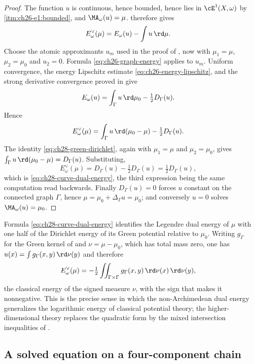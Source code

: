 \begin{proof}
The function $u$ is continuous, hence bounded, hence lies in
$\cE^1(X,\omega)$ by
\,\cref{itm:ch26-e1:bounded}, and
$\MA_\omega(u)=\mu$.   therefore gives
\[
 E^\vee_\omega(\mu)=E_\omega(u)-\int u\,\rd\mu .
\]
Choose the atomic approximants $u_m$ used in the proof of
, now with $\mu_1=\mu$,
$\mu_2=\mu_0$ and $u_2=0$.  Formula \eqref{eq:ch26-graph-energy} applies
to $u_m$.  Uniform convergence, the energy Lipschitz estimate
\eqref{eq:ch26-energy-lipschitz}, and the strong derivative convergence proved in
 give
\[
 E_\omega(u)=\int_\Gamma u\,\rd\mu_0-\tfrac12 D_\Gamma(u).
\]
Hence
\[
 E^\vee_\omega(\mu)
 =\int_\Gamma u\,\rd(\mu_0-\mu)-\tfrac12D_\Gamma(u).
\]
The identity \eqref{eq:ch28-green-dirichlet}, again with
$\mu_1=\mu$ and $\mu_2=\mu_0$, gives
$\int_\Gamma u\,\rd(\mu_0-\mu)=D_\Gamma(u)$.  Substituting,
\[
 E^\vee_\omega(\mu)=D_\Gamma(u)-\tfrac12D_\Gamma(u)
 =\tfrac12D_\Gamma(u),
\]
which is \eqref{eq:ch28-curve-dual-energy}, the third expression being the
same computation read backwards.  Finally $D_\Gamma(u)=0$ forces $u$
constant on the connected graph $\Gamma$, hence
$\mu=\mu_0+\Delta_\Gamma u=\mu_0$; and conversely $u=0$ solves
$\MA_\omega(u)=\mu_0$.
\end{proof}

\begin{remark}
\label{rem:ch28-classical-energy}
Formula \eqref{eq:ch28-curve-dual-energy} identifies the Legendre dual
energy of $\mu$ with one half of the Dirichlet energy of its Green
potential relative to $\mu_0$.  Writing $g_\Gamma$ for the Green kernel
of  and $\nu=\mu-\mu_0$, which has total mass
zero, one has $u(x)=\int g_\Gamma(x,y)\,\rd\nu(y)$ and therefore
\[
 E^\vee_\omega(\mu)
 =-\tfrac12\iint_{\Gamma\times\Gamma}
    g_\Gamma(x,y)\,\rd\nu(x)\,\rd\nu(y),
\]
the classical energy of the signed measure $\nu$, with the sign that makes
it nonnegative.  This is the precise sense in which the non-Archimedean dual
energy generalizes the logarithmic energy of classical potential theory; the
higher-dimensional theory replaces the quadratic form by the mixed
intersection inequalities of .
\end{remark}

\subsection{A solved equation on a four-component chain}
\label{sec:ch28-chain}

